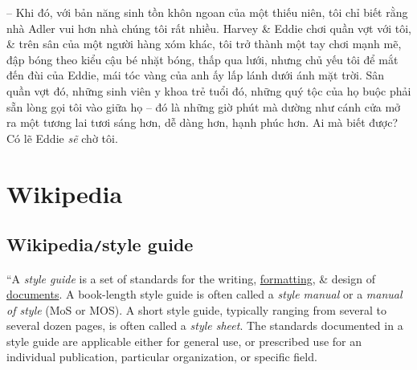 \documentclass{article}
\begin{document}
\begin{itemize}
	-- Khi đó, với bản năng sinh tồn khôn ngoan của một thiếu niên, tôi chỉ biết rằng nhà Adler vui hơn nhà chúng tôi rất nhiều. {\sc Harvey \& Eddie} chơi quần vợt với tôi, \& trên sân của một người hàng xóm khác, tôi trở thành một tay chơi mạnh mẽ, đập bóng theo kiểu cậu bé nhặt bóng, thấp qua lưới, nhưng chủ yếu tôi để mắt đến đùi của {\sc Eddie}, mái tóc vàng của anh ấy lấp lánh dưới ánh mặt trời. Sân quần vợt đó, những sinh viên y khoa trẻ tuổi đó, những quý tộc của họ buộc phải sẵn lòng gọi tôi vào giữa họ -- đó là những giờ phút mà dường như cánh cửa mở ra một tương lai tươi sáng hơn, dễ dàng hơn, hạnh phúc hơn. Ai mà biết được? Có lẽ {\sc Eddie} {\it sẽ} chờ tôi.
\end{itemize}





\section{Wikipedia}

\subsection{Wikipedia{\tt/}style guide}
``A {\it style guide} is a set of standards for the writing, \href{https://en.wikipedia.org/wiki/Typesetting}{formatting}, \& design of \href{https://en.wikipedia.org/wiki/Document}{documents}. A book-length style guide is often called a {\it style manual} or a {\it manual of style} (MoS or MOS). A short style guide, typically ranging from several to several dozen pages, is often called a {\it style sheet}. The standards documented in a style guide are applicable either for general use, or prescribed use for an individual publication, particular organization, or specific field.
\end{document}

